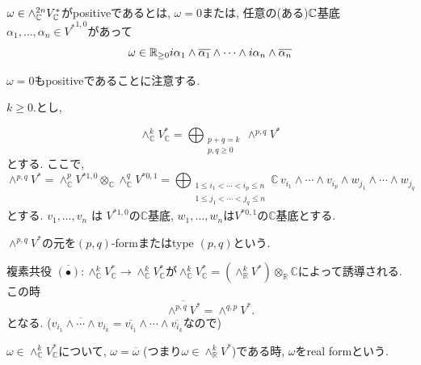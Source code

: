 \begin{tcolorbox}[mybox]
\begin{defn}
\label{defn-M-4.4.2}
$\omega \in \wedge^{2n}_{\mathbb{C}} V_{\mathbb{C}}^{*}$がpositiveであるとは, $\omega=0$または, 
任意の(ある)$\mathbb{C}$基底$\alpha_1, \ldots, \alpha_n \in {V^{*}}^{1,0}$があって
$$
\omega \in  \mathbb{R}_{\ge 0} i \alpha_1 \wedge \overline{\alpha_1} \wedge \cdots \wedge i \alpha_n\wedge \overline{\alpha_n}
$$
\end{defn}
\end{tcolorbox}
$\omega=0$もpositiveであることに注意する. 


\begin{tcolorbox}[mybox]
\begin{defn}
\label{defn-M-4.4.3}
\(k\ge 0.\)とし, 

\[
\wedge_{\mathbb{C}}^k V_{\mathbb{C}}^*
=
\bigoplus_{\substack{p+q=k\\ p,q\ge 0}}
\wedge^{p,q}V^*
\]
とする. ここで, 
\[
\wedge^{p,q}V^*
=
\wedge_{\mathbb{C}}^p V^{*1,0}
\otimes_{\mathbb{C}}
\wedge_{\mathbb{C}}^q V^{*0,1}
=
\bigoplus_{\substack{1\le i_1<\cdots<i_p\le n\\
1\le j_1<\cdots<j_q\le n}}
\mathbb{C}\,
v_{i_1}\wedge\cdots\wedge v_{i_p}
\wedge w_{j_1}\wedge\cdots\wedge w_{j_q}
\]
とする. 
 \(v_1,\ldots,v_n\) は \(V^{*1,0}\)の\(\mathbb{C}\)基底, 
$w_1,\ldots,w_n$は$V^{*0,1}$の\(\mathbb{C}\)基底とする. 

\(\wedge^{p,q}V^*\)の元を\((p,q)\)-formまたはtype \((p,q)\)という. 
\end{defn}
\end{tcolorbox}

複素共役
 $\overline{(\bullet)}:
 \wedge_{\mathbb{C}}^k V_{\mathbb{C}}^*\to \wedge_{\mathbb{C}}^k V_{\mathbb{C}}^*
 $が$\wedge_{\mathbb{C}}^k V_{\mathbb{C}}^*
=
(\wedge_{\mathbb{R}}^k V^*)\otimes_{\mathbb{R}}\mathbb{C}
$によって誘導される.
この時
\[
\overline{\wedge^{p,q}V^*}
=
\wedge^{q,p}V^*.
\]
となる. 
($\overline{v_{i_1}\wedge\cdots\wedge v_{i_k}}=\overline{v_{i_1}}\wedge\cdots\wedge \overline{v_{i_k}}$なので)



\begin{tcolorbox}[mybox]
\begin{defn}
$\omega \in \wedge_{\mathbb{C}}^k V_{\mathbb{C}}^*$について, 
$\omega=\overline{\omega}$ (つまり$\omega \in \wedge_{\mathbb{R}}^k V^*$)である時, 
$\omega$をreal formという. 
\end{defn}
\end{tcolorbox}

